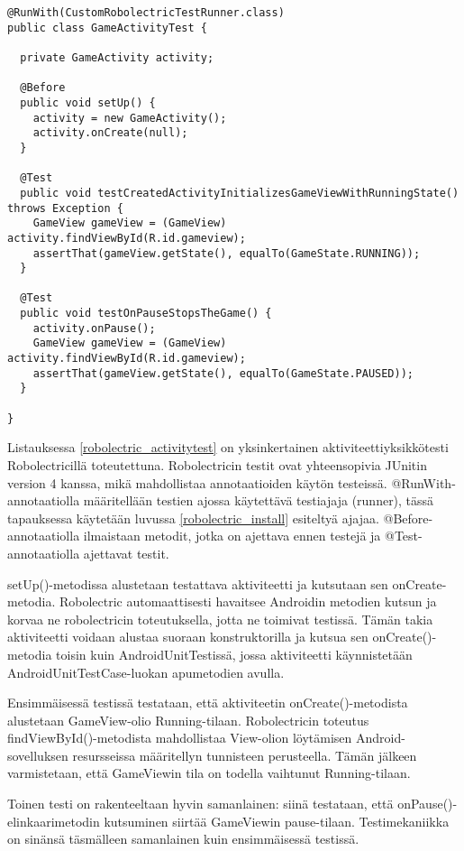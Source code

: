 \begin{lstlisting}[float,label=robolectric_activitytest,caption=Robolectric Activity test]
@RunWith(CustomRobolectricTestRunner.class)
public class GameActivityTest {

  private GameActivity activity;

  @Before
  public void setUp() {
    activity = new GameActivity();
    activity.onCreate(null);
  }

  @Test
  public void testCreatedActivityInitializesGameViewWithRunningState() throws Exception {
    GameView gameView = (GameView) activity.findViewById(R.id.gameview);
    assertThat(gameView.getState(), equalTo(GameState.RUNNING));
  }
  
  @Test
  public void testOnPauseStopsTheGame() {
  	activity.onPause();
  	GameView gameView = (GameView) activity.findViewById(R.id.gameview);
  	assertThat(gameView.getState(), equalTo(GameState.PAUSED));
  }
  
}
\end{lstlisting}

Listauksessa \ref{robolectric_activitytest} on yksinkertainen aktiviteettiyksikkötesti Robolectricillä toteutettuna. Robolectricin testit ovat yhteensopivia JUnitin version 4 kanssa, mikä mahdollistaa annotaatioiden käytön testeissä. @RunWith-annotaatiolla määritellään testien ajossa käytettävä testiajaja (runner), tässä tapauksessa käytetään luvussa \ref{robolectric_install} esiteltyä ajajaa. @Before-annotaatiolla ilmaistaan metodit, jotka on ajettava ennen testejä ja @Test-annotaatiolla ajettavat testit.

setUp()-metodissa alustetaan testattava aktiviteetti ja kutsutaan sen onCreate-metodia. Robolectric automaattisesti havaitsee Androidin metodien kutsun ja korvaa ne robolectricin toteutuksella, jotta ne toimivat testissä. Tämän takia aktiviteetti voidaan alustaa suoraan konstruktorilla ja kutsua sen onCreate()-metodia toisin kuin AndroidUnitTestissä, jossa aktiviteetti käynnistetään AndroidUnitTestCase-luokan apumetodien avulla.

Ensimmäisessä testissä testataan, että aktiviteetin onCreate()-metodista alustetaan GameView-olio Running-tilaan. Robolectricin toteutus findViewById()-metodista mahdollistaa View-olion löytämisen Android-sovelluksen resursseissa määritellyn tunnisteen perusteella. Tämän jälkeen varmistetaan, että GameViewin tila on todella vaihtunut Running-tilaan. 

Toinen testi on rakenteeltaan hyvin samanlainen: siinä testataan, että onPause()-elinkaarimetodin kutsuminen siirtää GameViewin pause-tilaan. Testimekaniikka on sinänsä täsmälleen samanlainen kuin ensimmäisessä testissä.

